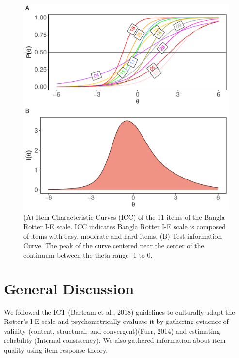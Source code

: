 \documentclass[
  english,
  man]{apa6}
\begin{document}
\begin{figure}
\includegraphics[width=7in]{Figures/600/icc_tic} \caption{(A) Item Characteristic Curves (ICC) of the 11 items of the Bangla Rotter I-E scale. ICC indicates Bangla Rotter I-E scale is composed of items with easy, moderate and hard items. (B) Test information Curve. The peak of the curve centered near the center of the continuum between the theta range -1 to 0.}\label{fig:figICC}
\end{figure}

\hypertarget{general-discussion}{%
\section{General Discussion}\label{general-discussion}}

We followed the ICT (Bartram et al., 2018) guidelines to culturally adapt the Rotter's I-E scale and psychometrically evaluate it by gathering evidence of validity (content, structural, and convergent)(Furr, 2014) and estimating reliability (Internal consistency). We also gathered information about item quality using item response theory.
\end{document}

